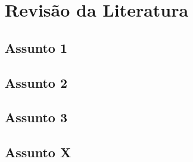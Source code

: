 \chapter{Revisão da Literatura}
\lipsum[1]

\section{Assunto 1}
\lipsum[3-5]
\section{Assunto 2}
\lipsum[2-4]
\section{Assunto 3}
\lipsum[3-5]
\section{Assunto X}
\lipsum[2-4]
